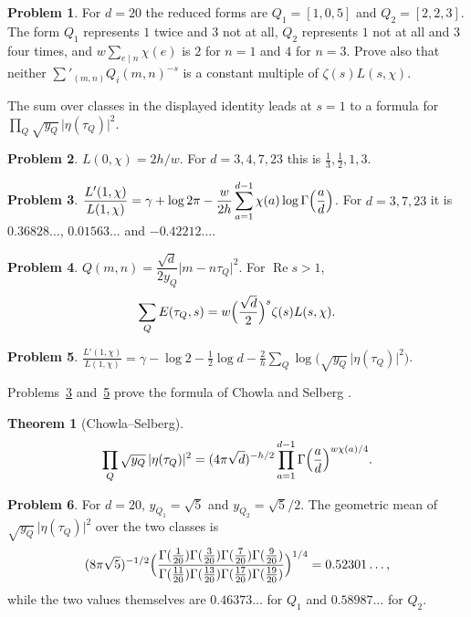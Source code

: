 \documentclass[reqno]{amsart}
\theoremstyle{definition}
\newtheorem{problem}{Problem}[section]
\theoremstyle{plain}
\newtheorem{theorem}{Theorem}[section]
\begin{document}
\begin{problem}\label{pr:d20-reps}
For \(d = 20\) the reduced forms are \(Q_1 = [1, 0, 5]\) and \(Q_2 = [2, 2, 3]\).  The form \(Q_1\) represents \(1\) twice and \(3\) not at all, \(Q_2\) represents \(1\) not at all and \(3\) four times, and \(w\sum_{e \mid n}\chi(e)\) is \(2\) for \(n = 1\) and \(4\) for \(n = 3\).  Prove also that neither \(\sum'_{(m,n)}Q_i(m,n)^{-s}\) is a constant multiple of \(\zeta(s)L(s,\chi)\).
\end{problem}

The sum over classes in the displayed identity leads at \(s=1\) to a formula for \(\prod_Q\sqrt{y_Q}\,\lvert\eta(\tau_Q)\rvert^2\).

\begin{problem}\label{pr:L0-gen}
\(L(0, \chi) = 2h/w\).  For \(d = 3, 4, 7, 23\) this is \(\frac13, \frac12, 1, 3\).
\end{problem}

\begin{problem}\label{pr:lerch-gen}
\(\displaystyle \frac{L'(1, \chi)}{L(1, \chi)} = \gamma + \log 2\pi - \frac{w}{2h} \sum_{a=1}^{d-1} \chi(a) \log\Gamma\Bigl(\frac ad\Bigr)\).  For \(d = 3, 7, 23\) it is \(0.36828\ldots\), \(0.01563\ldots\) and \(-0.42212\ldots\).
\end{problem}

\begin{problem}\label{pr:form-E}
\(Q(m,n)=\dfrac{\sqrt d}{2 y_Q}\lvert m-n\tau_Q\rvert^2\).  For \(\operatorname{Re} s>1\),
\[
  \sum_Q E(\tau_Q, s) = w \Bigl(\frac{\sqrt d}{2}\Bigr)^{s} \zeta(s) L(s, \chi) .
\]
\end{problem}

\begin{problem}\label{pr:LL-eta-gen}
\(\displaystyle \frac{L'(1, \chi)}{L(1, \chi)} = \gamma - \log 2 - \frac12\log d - \frac2h \sum_Q \log\bigl(\sqrt{y_Q}\, \lvert\eta(\tau_Q)\rvert^2\bigr)\).
\end{problem}

Problems~\ref{pr:lerch-gen} and~\ref{pr:LL-eta-gen} prove the formula of Chowla and Selberg \cite{CS}.

\begin{theorem}[Chowla--Selberg]\label{thm:cs}
\[
  \prod_Q \sqrt{y_Q}\, \lvert\eta(\tau_Q)\rvert^2 = (4\pi\sqrt d)^{-h/2} \prod_{a=1}^{d-1} \Gamma\Bigl(\frac ad\Bigr)^{w\chi(a)/4} .
\]
\end{theorem}

\begin{problem}\label{pr:d20-mean}
For \(d = 20\), \(y_{Q_1} = \sqrt5\) and \(y_{Q_2} = \sqrt5/2\).  The geometric mean of \(\sqrt{y_Q}\,\lvert\eta(\tau_Q)\rvert^2\) over the two classes is
\[
  (8\pi\sqrt5)^{-1/2} \Bigl(\frac{\Gamma(\frac1{20})\Gamma(\frac3{20})\Gamma(\frac7{20})\Gamma(\frac9{20})}{\Gamma(\frac{11}{20})\Gamma(\frac{13}{20})\Gamma(\frac{17}{20})\Gamma(\frac{19}{20})}\Bigr)^{1/4} = 0.52301\ldots ,
\]
while the two values themselves are \(0.46373\ldots\) for \(Q_1\) and \(0.58987\ldots\) for \(Q_2\).
\end{problem}
\end{document}
